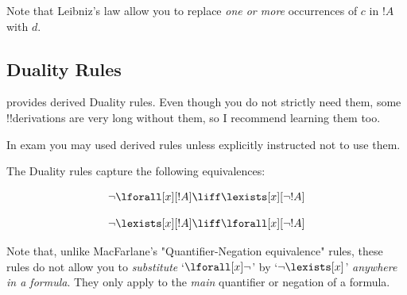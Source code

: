 \documentclass[../../../../include/open-logic-section]{subfiles}
\begin{document}
Note that Leibniz's law allow you to replace \emph{one or more} 
occurrences of $c$ in $!A$ with $d$.

\subsection{Duality Rules}

 provides derived Duality rules. Even though you
do not strictly need them, some !!{derivation}s are very long without
them, so I recommend learning them too. 

In exam you may used derived rules unless explicitly instructed 
not to use them.

The Duality rules capture the following equivalences:

    $$\lnot\lforall[x][!A]\liff\lexists[x][\lnot!A]$$

    $$\lnot\lexists[x][!A]\liff\lforall[x][\lnot!A]$$

Note that, unlike MacFarlane's "Quantifier-Negation equivalence" rules,
these rules do not allow you to \emph{substitute} `$\lforall[x]\lnot$' 
by `$\lnot\lexists[x]$' \emph{anywhere in a formula}. They only apply
to the \emph{main} quantifier or negation of a formula. 
\end{document}
